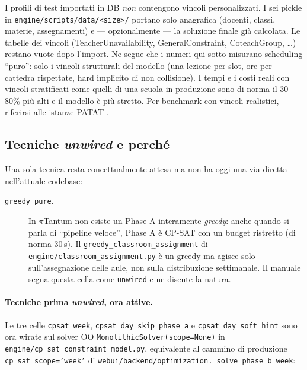 \begin{avvertenzabox}
I profili di test importati in DB \emph{non} contengono
vincoli personalizzati. I sei pickle in
\texttt{engine/scripts/data/<size>/} portano solo
anagrafica (docenti, classi, materie, assegnamenti) e ---
opzionalmente --- la soluzione finale gi\`a calcolata.
Le tabelle dei vincoli (TeacherUnavailability,
GeneralConstraint, CoteachGroup, \dots) restano vuote dopo
l'import. Ne segue che i numeri qui sotto misurano
scheduling ``puro'': solo i vincoli strutturali del
modello (una lezione per slot, ore per cattedra
rispettate, hard implicito di non collisione). I tempi e
i costi reali con vincoli stratificati come quelli di una
scuola in produzione sono di norma il 30--80\% pi\`u alti
e il modello \`e pi\`u stretto. Per benchmark con vincoli
realistici, riferirsi alle istanze PATAT
\cite{mccollum2010,patat}.
\end{avvertenzabox}

\subsection{Tecniche \emph{unwired} e perch\'e}

Una sola tecnica resta concettualmente attesa ma non ha
oggi una via diretta nell'attuale codebase:

\begin{description}
\item[\texttt{greedy\_pure}.] In $\pi$Tantum non esiste un
  Phase A interamente \emph{greedy}: anche quando si parla
  di ``pipeline veloce'', Phase A \`e CP-SAT con un budget
  ristretto (di norma 30\,s). Il \texttt{greedy\_classroom\_assignment}
  di \texttt{engine/classroom\_assignment.py} \`e un greedy
  ma agisce solo sull'assegnazione delle aule, non sulla
  distribuzione settimanale. Il manuale segna questa
  cella come \texttt{unwired} e ne discute la natura.
\end{description}

\paragraph{Tecniche prima \emph{unwired}, ora attive.}
Le tre celle \texttt{cpsat\_week},
\texttt{cpsat\_day\_skip\_phase\_a} e
\texttt{cpsat\_day\_soft\_hint} sono ora wirate sul
solver OO \texttt{MonolithicSolver(scope=None)} in
\texttt{engine/cp\_sat\_constraint\_model.py}, equivalente
al cammino di produzione
\texttt{cp\_sat\_scope='week'} di
\texttt{webui/backend/optimization.\_solve\_phase\_b\_week}:

